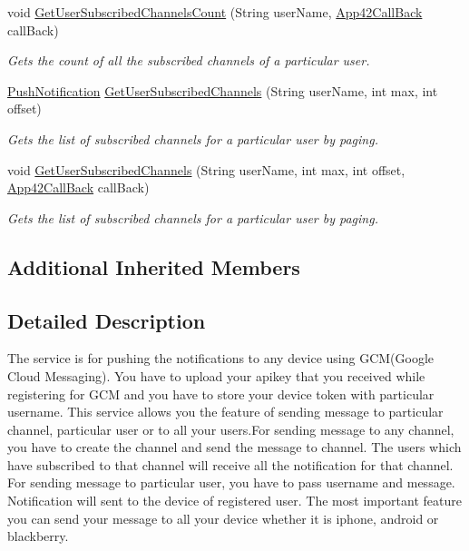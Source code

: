 \begin{DoxyCompactItemize}
void \hyperlink{classcom_1_1shephertz_1_1app42_1_1paas_1_1sdk_1_1csharp_1_1push_notification_1_1_push_notification_service_adad6ac39fa7784ca4025b91a5b3add0f}{Get\+User\+Subscribed\+Channels\+Count} (String user\+Name, \hyperlink{interfacecom_1_1shephertz_1_1app42_1_1paas_1_1sdk_1_1csharp_1_1_app42_call_back}{App42\+Call\+Back} call\+Back)
\begin{DoxyCompactList}\small\item\em Gets the count of all the subscribed channels of a particular user. \end{DoxyCompactList}\item 
\hyperlink{classcom_1_1shephertz_1_1app42_1_1paas_1_1sdk_1_1csharp_1_1push_notification_1_1_push_notification}{Push\+Notification} \hyperlink{classcom_1_1shephertz_1_1app42_1_1paas_1_1sdk_1_1csharp_1_1push_notification_1_1_push_notification_service_aded5ffd4c36f0ca293fdec25186841c9}{Get\+User\+Subscribed\+Channels} (String user\+Name, int max, int offset)
\begin{DoxyCompactList}\small\item\em Gets the list of subscribed channels for a particular user by paging. \end{DoxyCompactList}\item 
void \hyperlink{classcom_1_1shephertz_1_1app42_1_1paas_1_1sdk_1_1csharp_1_1push_notification_1_1_push_notification_service_aceae1b45112dae8709b3c24406462489}{Get\+User\+Subscribed\+Channels} (String user\+Name, int max, int offset, \hyperlink{interfacecom_1_1shephertz_1_1app42_1_1paas_1_1sdk_1_1csharp_1_1_app42_call_back}{App42\+Call\+Back} call\+Back)
\begin{DoxyCompactList}\small\item\em Gets the list of subscribed channels for a particular user by paging. \end{DoxyCompactList}\end{DoxyCompactItemize}
\subsection*{Additional Inherited Members}


\subsection{Detailed Description}
The service is for pushing the notifications to any device using G\+C\+M(\+Google Cloud Messaging). You have to upload your apikey that you received while registering for G\+C\+M and you have to store your device token with particular username. This service allows you the feature of sending message to particular channel, particular user or to all your users.\+For sending message to any channel, you have to create the channel and send the message to channel. The users which have subscribed to that channel will receive all the notification for that channel. For sending message to particular user, you have to pass username and message. Notification will sent to the device of registered user. The most important feature you can send your message to all your device whether it is iphone, android or blackberry. 




